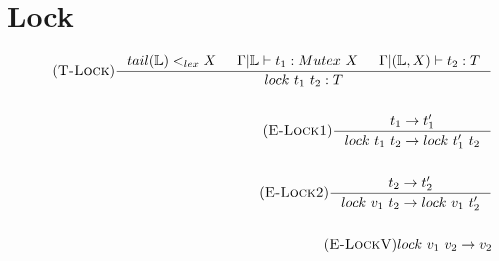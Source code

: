 \documentclass[12pt]{article}
\def\lock {\mathbb{L}}
\begin{document}
\section{Lock}
\begin{align*}
\tag{\textsc{T-Lock}}
\inference[]{tail(\lock)<_{lex}X & \Gamma|\lock \vdash t_1:Mutex~X 
& \Gamma|(\lock,X) \vdash t_2:T}{lock~t_1~t_2:T}
\\
\\
\tag{\textsc{E-Lock1}}
\inference[]{t_1->t_1'}{lock~t_1~t_2 -> lock~t_1'~t_2}
\\
\\
\tag{\textsc{E-Lock2}}
\inference[]{t_2->t_2'}{lock~v_1~t_2 -> lock~v_1~t_2'}
\\
\\
\tag{\textsc{E-LockV}}lock~v_1~v_2 -> v_2
\end{align*}
\end{document}
